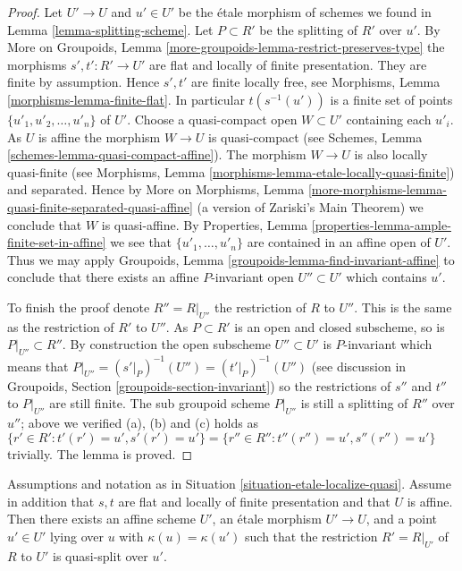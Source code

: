 \begin{proof}
Let $U' \to U$ and $u' \in U'$ be the \'etale morphism of schemes we found in
Lemma \ref{lemma-splitting-scheme}.
Let $P \subset R'$ be the splitting of $R'$ over $u'$. By
More on Groupoids, Lemma \ref{more-groupoids-lemma-restrict-preserves-type}
the morphisms $s', t' : R' \to U'$ are flat and locally of finite presentation.
They are finite by assumption. Hence $s', t'$ are finite locally
free, see
Morphisms, Lemma \ref{morphisms-lemma-finite-flat}.
In particular $t(s^{-1}(u'))$ is a finite set of points
$\{u'_1, u'_2, \ldots, u'_n\}$ of $U'$. Choose a quasi-compact open
$W \subset U'$ containing each $u'_i$. As $U$ is affine the morphism
$W \to U$ is quasi-compact (see
Schemes, Lemma \ref{schemes-lemma-quasi-compact-affine}).
The morphism $W \to U$ is also locally quasi-finite (see
Morphisms, Lemma \ref{morphisms-lemma-etale-locally-quasi-finite})
and separated. Hence by
More on Morphisms,
Lemma \ref{more-morphisms-lemma-quasi-finite-separated-quasi-affine}
(a version of Zariski's Main Theorem)
we conclude that $W$ is quasi-affine. By
Properties, Lemma \ref{properties-lemma-ample-finite-set-in-affine}
we see that $\{u'_1, \ldots, u'_n\}$ are contained in an affine
open of $U'$. Thus we may apply
Groupoids, Lemma \ref{groupoids-lemma-find-invariant-affine}
to conclude that there exists an affine $P$-invariant open
$U'' \subset U'$ which contains $u'$.

\medskip\noindent
To finish the proof denote $R'' = R|_{U''}$ the restriction of $R$
to $U''$. This is the same as the restriction of $R'$ to $U''$.
As $P \subset R'$ is an open and closed subscheme, so is
$P|_{U''} \subset R''$. By construction the open subscheme $U'' \subset U'$
is $P$-invariant which means that
$P|_{U''} = (s'|_P)^{-1}(U'') = (t'|_P)^{-1}(U'')$
(see discussion in
Groupoids, Section \ref{groupoids-section-invariant})
so the restrictions of $s''$ and $t''$ to $P|_{U''}$ are still finite.
The sub groupoid scheme $P|_{U''}$ is still a splitting of
$R''$ over $u''$; above we verified (a), (b) and (c) holds as
$\{r' \in R': t'(r') = u', s'(r') = u'\} =
\{r'' \in R'': t''(r'') = u', s''(r'') = u'\}$ trivially.
The lemma is proved.
\end{proof}

\begin{lemma}
\label{lemma-quasi-splitting-affine-scheme}
Assumptions and notation as in
Situation \ref{situation-etale-localize-quasi}.
Assume in addition that $s, t$ are flat and locally of finite presentation
and that $U$ is affine.
Then there exists an affine scheme $U'$, an \'etale morphism
$U' \to U$, and a point $u' \in U'$ lying over $u$ with
$\kappa(u) = \kappa(u')$ such that the restriction $R' = R|_{U'}$ of
$R$ to $U'$ is quasi-split over $u'$.
\end{lemma}

